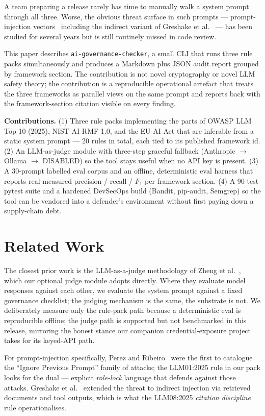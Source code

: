 \documentclass[conference]{IEEEtran}
\begin{document}
A team preparing a release rarely has time to manually walk a system
prompt through all three. Worse, the obvious threat surface in such
prompts --- prompt-injection vectors~\cite{perez2022ignore} including
the indirect variant of Greshake et al.~\cite{greshake2023indirect}
--- has been studied for several years but is still routinely missed
in code review.

This paper describes \texttt{ai-governance-checker}, a small CLI
that runs three rule packs simultaneously and produces a Markdown
plus JSON audit report grouped by framework section. The
contribution is not novel cryptography or novel LLM safety theory;
the contribution is a reproducible operational artefact that
treats the three frameworks as parallel views on the same prompt and
reports back with the framework-section citation visible on every
finding.

\textbf{Contributions.} (1) Three rule packs implementing the parts
of OWASP LLM Top 10 (2025), NIST AI RMF 1.0, and the EU AI Act that
are inferable from a static system prompt --- 20 rules in total,
each tied to its published framework id. (2) An LLM-as-judge module
with three-step graceful fallback (Anthropic $\rightarrow$ Ollama
$\rightarrow$ DISABLED) so the tool stays useful when no API key is
present. (3) A 30-prompt labelled eval corpus and an offline,
deterministic eval harness that reports real measured precision /
recall / $F_1$ per framework section. (4) A 90-test pytest suite
and a hardened DevSecOps build (Bandit, pip-audit, Semgrep) so the
tool can be vendored into a defender's environment without first
paying down a supply-chain debt.

\section{Related Work}

The closest prior work is the LLM-as-a-judge methodology of Zheng et
al.~\cite{zheng2023judging}, which our optional judge module
adopts directly. Where they evaluate model responses against each
other, we evaluate the system prompt against a fixed governance
checklist; the judging mechanism is the same, the substrate is
not. We deliberately measure only the rule-pack path because a
deterministic eval is reproducible offline; the judge path is
supported but not benchmarked in this release, mirroring the honest
stance our companion credential-exposure project takes for its
keyed-API path.

For prompt-injection specifically, Perez and
Ribeiro~\cite{perez2022ignore} were the first to catalogue the
``Ignore Previous Prompt'' family of attacks; the LLM01:2025 rule in
our pack looks for the dual --- explicit \emph{role-lock} language
that defends against those attacks. Greshake et
al.~\cite{greshake2023indirect} extended the threat to indirect
injection via retrieved documents and tool outputs, which is what
the LLM08:2025 \emph{citation discipline} rule operationalises.
\end{document}
